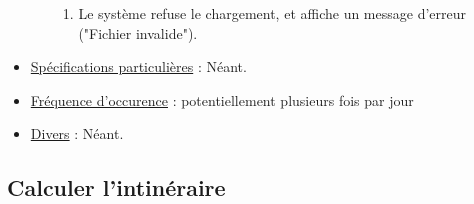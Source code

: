 \documentclass[a4paper]{article}
\begin{document}
\begin{itemize}[label = \textbullet, font = \color{orange}]
\begin{enumerate}
        \begin{enumerate}
            \item Le système refuse le chargement, et affiche un message
                d'erreur ("Fichier invalide").
        \end{enumerate}
    \end{enumerate}
    \item \underline{Spécifications particulières} : Néant.
    \item \underline{Fréquence d'occurence} : potentiellement plusieurs fois
        par jour
    \item \underline{Divers} : Néant.
\end{itemize}

\subsection{Calculer l'intinéraire}
\end{document}
